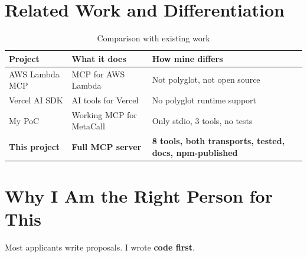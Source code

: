 \documentclass[12pt, a4paper]{article}
\begin{document}
\section{Related Work and Differentiation}

\begin{table}[H]
\centering
{}
\begin{tabularx}{\textwidth}{l X X}
  \toprule
  \rowcolor{mcblue!15}
  \textbf{Project} & \textbf{What it does} &
  \textbf{How mine differs} \\
  \midrule
  AWS Lambda MCP & MCP for AWS Lambda &
    Not polyglot, not open source \\
  Vercel AI SDK & AI tools for Vercel &
    No polyglot runtime support \\
  My PoC & Working MCP for MetaCall &
    Only stdio, 3 tools, no tests \\
  \textbf{This project} & \textbf{Full MCP server} &
    \textbf{8 tools, both transports, tested, docs, npm-published} \\
  \bottomrule
\end{tabularx}
\caption{Comparison with existing work}
\end{table}

\newpage
\section{Why I Am the Right Person for This}

\begin{highlightbox}
Most applicants write proposals. I wrote \textbf{code first}.
\end{highlightbox}
\end{document}

